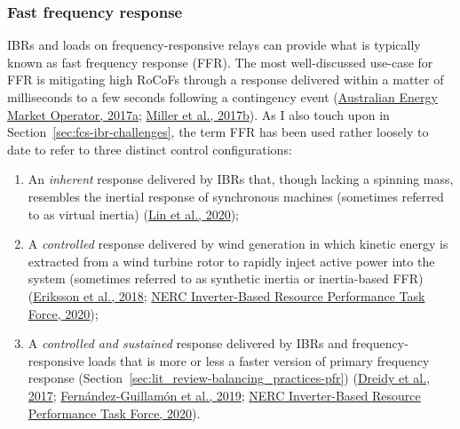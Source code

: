 \documentclass[12pt,a4paper,]{report}
\providecommand{\tightlist}{%
  \setlength{\itemsep}{0pt}\setlength{\parskip}{0pt}}
\begin{document}
\hypertarget{fast-frequency-response}{%
\subsubsection{Fast frequency response}\label{fast-frequency-response}}

IBRs and loads on frequency-responsive relays can provide what is
typically known as fast frequency response (FFR). The most
well-discussed use-case for FFR is mitigating high RoCoFs through a
response delivered within a matter of milliseconds to a few seconds
following a contingency event
(\protect\hyperlink{ref-australianenergymarketoperatorFastFrequencyResponse2017}{Australian
Energy Market Operator, 2017a};
\protect\hyperlink{ref-millerTechnologyCapabilitiesFast2017}{Miller et
al., 2017b}). As I also touch upon in
Section~\ref{sec:fcs-ibr-challenges}, the term FFR has been used rather
loosely to date to refer to three distinct control configurations:

\begin{enumerate}
\def\labelenumi{\arabic{enumi}.}
\tightlist
\item
  An \emph{inherent} response delivered by IBRs that, though lacking a
  spinning mass, resembles the inertial response of synchronous machines
  (sometimes referred to as virtual inertia)
  (\protect\hyperlink{ref-linResearchRoadmapGridForming2020}{Lin et al.,
  2020});
\item
  A \emph{controlled} response delivered by wind generation in which
  kinetic energy is extracted from a wind turbine rotor to rapidly
  inject active power into the system (sometimes referred to as
  synthetic inertia or inertia-based FFR)
  (\protect\hyperlink{ref-erikssonSyntheticInertiaFast2018}{Eriksson et
  al., 2018};
  \protect\hyperlink{ref-nercinverter-basedresourceperformancetaskforceFastFrequencyResponse2020}{NERC
  Inverter-Based Resource Performance Task Force, 2020});
\item
  A \emph{controlled and sustained} response delivered by IBRs and
  frequency-responsive loads that is more or less a faster version of
  primary frequency response
  (Section~\ref{sec:lit_review-balancing_practices-pfr})
  (\protect\hyperlink{ref-dreidyInertiaResponseFrequency2017}{Dreidy et
  al., 2017};
  \protect\hyperlink{ref-fernandez-guillamonPowerSystemsHigh2019}{Fernández-Guillamón
  et al., 2019};
  \protect\hyperlink{ref-nercinverter-basedresourceperformancetaskforceFastFrequencyResponse2020}{NERC
  Inverter-Based Resource Performance Task Force, 2020}).
\end{enumerate}
\end{document}
